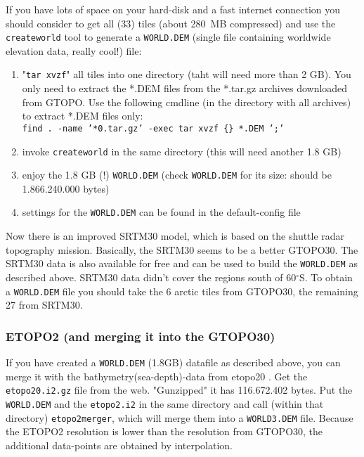 If you have lots of space on your hard-disk and a fast internet connection you should consider to
get all (33) tiles (about 280~MB compressed) and use the \texttt{createworld}
tool to generate a \texttt{WORLD.DEM} (single file containing worldwide elevation data, really cool!) file:

\begin{enumerate}
\item "\texttt{tar xvzf}"  all tiles into one directory (taht will need more than 2 GB).
      You only need to extract the *.DEM files from the *.tar.gz archives
      downloaded from GTOPO. Use the following cmdline (in the directory with
      all archives) to extract *.DEM files only: \\
      \texttt{find . -name '*0.tar.gz' -exec tar xvzf \{\}  *.DEM ';'}

\item invoke \texttt{createworld} in the same directory (this will need another 1.8 GB)
      
\item enjoy the 1.8 GB (!) \texttt{WORLD.DEM} (check \texttt{WORLD.DEM} for its size:
      should be 1.866.240.000 bytes)

\item settings for the \texttt{WORLD.DEM} can be found in the default-config file

\end{enumerate}

Now there is an improved SRTM30 model, which is based on the shuttle radar topography
mission. Basically, the SRTM30 seems to be a better GTOPO30. The SRTM30 data is also available
for free  and can be used to build the \texttt{WORLD.DEM} as described above. SRTM30 data didn't cover
the regions south of 60$^\circ$S. To obtain a \texttt{WORLD.DEM} file you should take the 6 arctic
tiles from GTOPO30, the remaining 27 from SRTM30.


\subsubsection{ETOPO2 (and merging it into the GTOPO30)}
If you have created a \texttt{WORLD.DEM} (1.8GB) datafile as described above, you can merge it with the bathymetry(sea-depth)-data from etopo20 \cite{etopo2}.
Get the \texttt{etopo20.i2.gz} file from the web. "Gunzipped" it has 116.672.402 bytes.
Put the \texttt{WORLD.DEM} and the \texttt{etopo2.i2} in the same directory and call (within that directory) \texttt{etopo2merger}, which will merge them into a \texttt{WORLD3.DEM} file.
Because the ETOPO2 resolution is lower than the resolution from GTOPO30, the additional data-points are obtained by interpolation.

